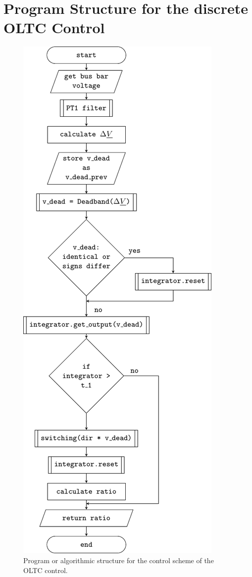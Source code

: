 \section{Program Structure for the discrete OLTC Control}

\begin{figure}[H]
    \centering
    \includegraphics[scale=.8]{tikz_graphics/images/oltc_algorithmics.pdf}
    \caption[Program or algorithmic structure for the control scheme of the \acs{OLTC} control]{Program or algorithmic structure for the control scheme of the \acs{OLTC} control.}
    \label{fig:oltc-program-plan}
\end{figure}


